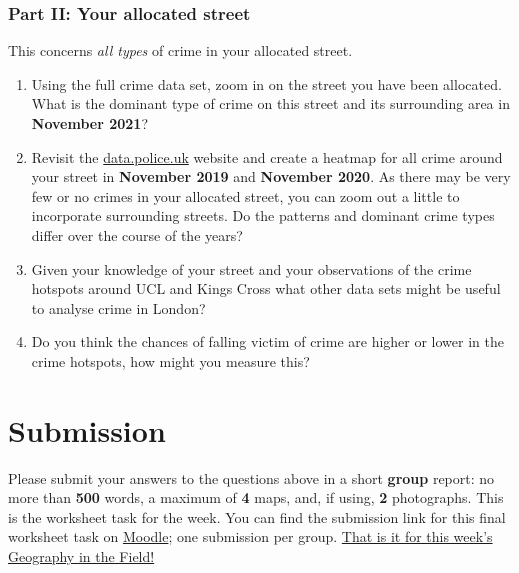 \documentclass[
]{book}
\providecommand{\tightlist}{%
  \setlength{\itemsep}{0pt}\setlength{\parskip}{0pt}}
\begin{document}
\hypertarget{part-ii-your-allocated-street}{%
\subsubsection*{Part II: Your allocated street}\label{part-ii-your-allocated-street}}

This concerns \emph{all types} of crime in your allocated street.

\begin{enumerate}
\def\labelenumi{\arabic{enumi}.}
\setcounter{enumi}{2}
\tightlist
\item
  Using the full crime data set, zoom in on the street you have been allocated. What is the dominant type of crime on this street and its surrounding area in \textbf{November 2021}?
\item
  Revisit the \href{https://data.police.uk/}{data.police.uk} website and create a heatmap for all crime around your street in \textbf{November 2019} and \textbf{November 2020}. As there may be very few or no crimes in your allocated street, you can zoom out a little to incorporate surrounding streets. Do the patterns and dominant crime types differ over the course of the years?
\item
  Given your knowledge of your street and your observations of the crime hotspots around UCL and Kings Cross what other data sets might be useful to analyse crime in London?
\item
  Do you think the chances of falling victim of crime are higher or lower in the crime hotspots, how might you measure this?
\end{enumerate}

\hypertarget{submission}{%
\section*{Submission}\label{submission}}

Please submit your answers to the questions above in a short \textbf{group} report: no more than \textbf{500} words, a maximum of \textbf{4} maps, and, if using, \textbf{2} photographs. This is the worksheet task for the week. You can find the submission link for this final worksheet task on \href{https://moodle.ucl.ac.uk/course/view.php?id=23839}{Moodle}; one submission per group. \href{https://www.youtube.com/watch?v=h_D3VFfhvs4}{That is it for this week's Geography in the Field!}
\end{document}
